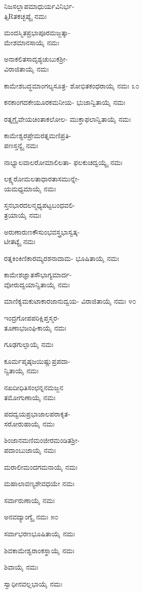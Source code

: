 ನಿಜಸಲ್ಲಾಪಮಾಧುರ್ಯವಿನಿರ್ಭ-\\ತ್ಸಿRತಕಚ್ಛಪ್ಯೈ ನಮಃ

ಮಂದಸ್ಮಿತಪ್ರಭಾಪೂರಮಜ್ಜತ್ಕಾ-\\ಮೇಶಮಾನಸಾಯೈ ನಮಃ

ಅನಾಕಲಿತಸಾದೃಶ್ಯಚುಬುಕಶ್ರೀ-\\ವಿರಾಜಿತಾಯೈ ನಮಃ

ಕಾಮೇಶಬದ್ಧಮಾಂಗಲ್ಯಸೂತ್ರ- ಶೋಭಿತಕಂಧರಾಯೈ ನಮಃ \num{೩೦}

ಕನಕಾಂಗದಕೇಯೂರಕಮನೀಯ- ಭುಜಾನ್ವಿತಾಯೈ ನಮಃ

ರತ್ನಗ್ರೈವೇಯಚಿಂತಾಕಲೋಲ- ಮುಕ್ತಾಫಲಾನ್ವಿತಾಯೈ ನಮಃ

ಕಾಮೇಶ್ವರಪ್ರೇಮರತ್ನಮಣಿಪ್ರತಿ-\\ಪಣಸ್ತನ್ಯೈ ನಮಃ

ನಾಭ್ಯಾಲವಾಲರೋಮಾಲಿಲತಾ- ಫಲಕುಚದ್ವಯ್ಯೈ ನಮಃ

ಲಕ್ಷ್ಯರೋಮಲತಾಧಾರತಾಸಮುನ್ನೇ-\\ಯಮಧ್ಯಮಾಯೈ ನಮಃ

ಸ್ತನಭಾರದಲನ್ಮಧ್ಯಪಟ್ಟಬಂಧವಲಿ-\\ತ್ರಯಾಯೈ ನಮಃ

ಅರುಣಾರುಣಕೌಸುಂಭವಸ್ತ್ರಭಾಸ್ವತ್ಕ-\\ಟೀತಟ್ಯೈ ನಮಃ

ರತ್ನಕಿಂಕಿಣಿಕಾರಮ್ಯರಶನಾದಾಮ- ಭೂಷಿತಾಯೈ ನಮಃ

ಕಾಮೇಶಜ್ಞಾತಸೌಭಾಗ್ಯಮಾರ್ದ-\\ವೋರುದ್ವಯಾನ್ವಿತಾಯೈ ನಮಃ

ಮಾಣಿಕ್ಯಮಕುಟಾಕಾರಜಾನುದ್ವಯ- ವಿರಾಜಿತಾಯೈ ನಮಃ \num{೪೦}

ಇಂದ್ರಗೋಪಪರಿಕ್ಷಿಪ್ತಸ್ಮರ-\\ತೂಣಾಭಜಂಘಿಕಾಯೈ ನಮಃ

ಗೂಢಗುಲ್ಫಾಯೈ ನಮಃ

ಕೂರ್ಮಪೃಷ್ಠಜಯಿಷ್ಣುಪ್ರಪದಾ-\\ನ್ವಿತಾಯೈ ನಮಃ

ನಖದೀಧಿತಿಸಂಛನ್ನನಮಜ್ಜನ\\ತಮೋಗುಣಾಯೈ ನಮಃ

ಪದದ್ವಯಪ್ರಭಾಜಾಲಪರಾಕೃತ-\\ಸರೋರುಹಾಯೈ ನಮಃ

ಶಿಂಜಾನಮಣಿಮಂಜೀರಮಂಡಿತಶ್ರೀ-\\ಪದಾಂಬುಜಾಯೈ ನಮಃ

ಮರಾಲೀಮಂದಗಮನಾಯೈ ನಮಃ

ಮಹಾಲಾವಣ್ಯಶೇವಧಯೇ ನಮಃ

ಸರ್ವಾರುಣಾಯೈ ನಮಃ

ಅನವದ್ಯಾಂಗ್ಯೈ ನಮಃ \num{೫೦}

ಸರ್ವಾಭರಣಭೂಷಿತಾಯೈ ನಮಃ

ಶಿವಕಾಮೇಶ್ವರಾಂಕಸ್ಥಾಯೈ ನಮಃ

ಶಿವಾಯೈ ನಮಃ

ಸ್ವಾಧೀನವಲ್ಲಭಾಯೈ ನಮಃ

